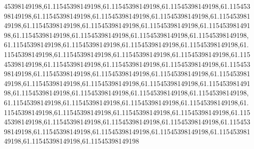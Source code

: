 45398149198,61.11545398149198,61.11545398149198,61.11545398149198,61.11545398149198,61.11545398149198,61.11545398149198,61.11545398149198,61.11545398149198,61.11545398149198,61.11545398149198,61.11545398149198,61.11545398149198,61.11545398149198,61.11545398149198,61.11545398149198,61.11545398149198,61.11545398149198,61.11545398149198,61.11545398149198,61.11545398149198,61.11545398149198,61.11545398149198,61.11545398149198,61.11545398149198,61.11545398149198,61.11545398149198,61.11545398149198,61.11545398149198,61.11545398149198,61.11545398149198,61.11545398149198,61.11545398149198,61.11545398149198,61.11545398149198,61.11545398149198,61.11545398149198,61.11545398149198,61.11545398149198,61.11545398149198,61.11545398149198,61.11545398149198,61.11545398149198,61.11545398149198,61.11545398149198,61.11545398149198,61.11545398149198,61.11545398149198,61.11545398149198,61.11545398149198,61.11545398149198,61.11545398149198,61.11545398149198,61.11545398149198,61.11545398149198,61.11545398149198,61.11545398149198,61.11545398149198,61.11545398149198,61.11545398149198,61.11545398149198
